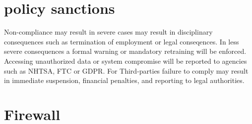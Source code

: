 \documentclass{article}
\begin{document}
\section{policy sanctions}
Non-compliance may result in severe cases may result in disciplinary consequences such as termination of employment or legal conseqences. In less severe consequences a formal warning or mandatory retraining will be enforced. Accessing unauthorized data or system compromise will be reported to agencies such as NHTSA, FTC or GDPR. For Third-parties failure to comply may result in immediate suspension, financial penalties, and reporting to legal authorities. 




\maketitle

\section{Firewall}
\end{document}
